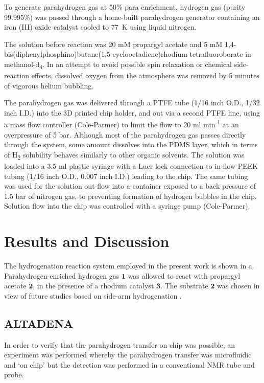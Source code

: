 To generate parahydrogen gas at 50\% para enrichment, hydrogen gas
(purity 99.995\%) was passed through a home-built parahydrogen generator
containing an iron (III) oxide catalyst cooled to 77~K using liquid
nitrogen.

The solution before reaction was 20 mM propargyl acetate and 5 mM
1,4-bis(diphenyl\-phosphino)\-butane(1,5-cyclo\-octadiene)\-rhodium
tetra\-fluoro\-borate in methanol-d\textsubscript{4}. In an attempt to
avoid possible spin relaxation or chemical side-reaction effects,
dissolved oxygen from the atmosphere was removed by 5 minutes of
vigorous helium bubbling.

The parahydrogen gas was delivered through a PTFE tube (1/16 inch O.D.,
1/32 inch I.D.) into the 3D printed chip holder, and out via a second
PTFE line, using a mass flow controller (Cole-Parmer) to limit the flow
to 20 ml min\textsuperscript{-1} at an overpressure of 5 bar. Although
most of the parahydrogen gas passes directly through the system, some
amount dissolves into the PDMS layer, which in terms of
H\textsubscript{2} solubility behaves similarly to other organic
solvents. The solution was loaded into a 3.5 ml plastic syringe with a
Luer lock connection to in-flow PEEK tubing (1/16 inch O.D., 0.007 inch
I.D.) leading to the chip. The same tubing was used for the solution
out-flow into a container exposed to a back pressure of 1.5 bar of
nitrogen gas, to preventing formation of hydrogen bubbles in the chip.
Solution flow into the chip was controlled with a syringe pump (Cole-Parmer).

\section{Results and Discussion}
The hydrogenation reaction system employed in the present work is shown in
a.
Para\-hydrogen-en\-riched hydrogen gas $\mathbf{1}$ was
allowed to react with propargyl acetate $\mathbf{2}$, in the presence of
a rhodium catalyst $\mathbf{3}$. The substrate $\mathbf{2}$ was chosen in
view of future studies based on side-arm hydrogenation
\cite{Reineri:2015he,cavallari201813,cavallari2015effects}.

\subsection{ALTADENA}

In order to verify that the parahydrogen transfer on chip was possible, an
experiment was performed whereby the parahydrogen transfer was microfluidic
and ‘on chip’ but the detection was performed in a conventional NMR tube and probe.

